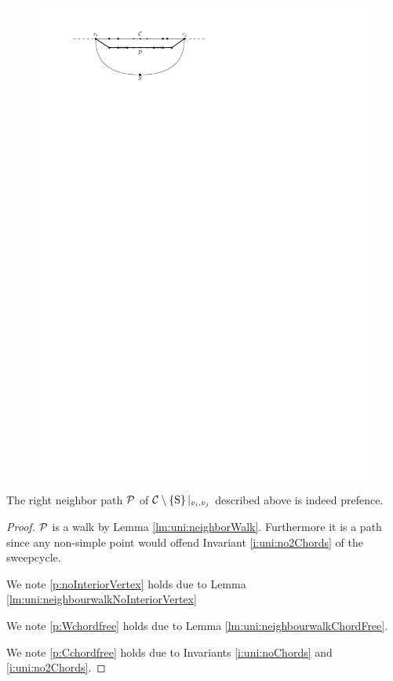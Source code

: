     \begin{figure}[h]
      \centering
      \includegraphics[scale=1]{unifiedAlgo/img/rightNeighbourWalk}
      \caption{}
      \label{fig:sweep:rightNeighbourwalk}
    \end{figure}

    \begin{lemma}
      \label{lm:uni:isPrefence}
      The right neighbor path $\P$ of $\cpath|_{v_i, v_j}$ described above is indeed prefence.
    \end{lemma}
    \begin{proof}
      $\P$ is a walk by Lemma \ref{lm:uni:neighborWalk}. Furthermore it is a path since any non-simple point would offend Invariant \ref{i:uni:no2Chords} of the sweepcycle.


      We note \ref{p:noInteriorVertex} holds due to Lemma \ref{lm:uni:neighbourwalkNoInteriorVertex}

      We note \ref{p:Wchordfree} holds due to Lemma \ref{lm:uni:neighbourwalkChordFree}.

      We note \ref{p:Cchordfree} holds due to Invariants \ref{i:uni:noChords} and \ref{i:uni:no2Chords}.
    \end{proof}

